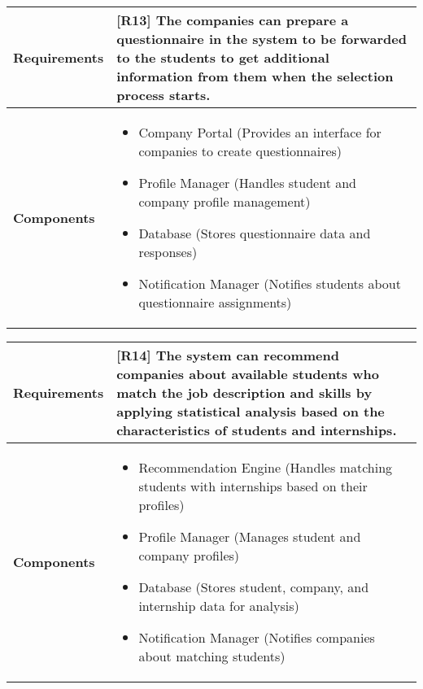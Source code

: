 \begin{table}[h!]
\centering
\begin{tabular}{|l|p{10cm}|}
\hline
\textbf{Requirements} & 
[R13] The companies can prepare a questionnaire in the system to be forwarded to the students to get
additional information from them when the selection process starts.\\
\hline
\textbf{Components} & 
\begin{itemize}
    \item Company Portal (Provides an interface for companies to create questionnaires)
    \item Profile Manager (Handles student and company profile management)
    \item Database (Stores questionnaire data and responses)
    \item Notification Manager (Notifies students about questionnaire assignments)
\end{itemize} \\
\hline
\end{tabular}
\label{tab:req_comp}
\end{table}

\begin{table}[h!]
\centering
\begin{tabular}{|l|p{10cm}|}
\hline
\textbf{Requirements} & 
[R14] The system can recommend companies about available students who match the job description and skills by applying statistical analysis based on the characteristics of students and internships.\\
\hline
\textbf{Components} & 
\begin{itemize}
    \item Recommendation Engine (Handles matching students with internships based on their profiles)
    \item Profile Manager (Manages student and company profiles)
    \item Database (Stores student, company, and internship data for analysis)
    \item Notification Manager (Notifies companies about matching students)
\end{itemize} \\
\hline
\end{tabular}
\label{tab:req_comp}
\end{table}

